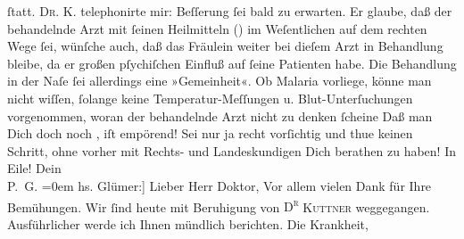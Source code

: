 \begin{ledgroupsized}[t]{13cm}
               ſtatt. \textsc{Dr. K.} telephonirte mir: Beſſerung ſei bald zu erwarten. Er glaube, daß der
               behandelnde Arzt mit ſeinen
               Heilmitteln (\label{K_L03056-3v}\label{K_L03056-3h}) im Weſentlichen auf dem
               rechten Wege ſei, wünſche {\pb}auch, daß das Fräulein weiter bei dieſem
                  Arzt in Behandlung
               bleibe, da er großen pſychiſchen Einfluß auf ſeine Patienten habe. Die Behandlung in
               der Naſe ſei allerdings eine »Gemeinheit«. Ob Malaria vorliege, könne man nicht
               wiſſen, ſolange keine Temperatur-Meſſungen u. Blut-Unterſuchungen vorgenommen, woran
               der behandelnde Arzt nicht
               zu denken ſcheine{\dotsfour}\pend
           \pstart
           Daß man Dich doch noch \label{K_L03056-4v}\label{K_L03056-4h}, iſt {\pb}empörend! Sei nur ja recht vorſichtig
               und thue keinen Schritt, ohne vorher mit Rechts- und Landeskundigen Dich berathen zu
               haben!\pend
           \pstart
           In Eile!\pend
           \pstart
           Dein {\\[\baselineskip]}\spacefill\mbox{P. G.}\pend
           \leftskip=0em{}{\bigskip}\pstart
           \noindent{}{\pb}{[}hs. Glümer:{]} Lieber Herr Doktor,\pend
           \pstart
           Vor allem vielen Dank für Ihre Bemühungen. Wir ſind heute mit Beruhigung
               von \textsc{D\textsuperscript{r}}{ }\textsc{Kuttner} weggegangen. Ausführlicher werde ich Ihnen mündlich berichten. Die Krankheit,

\end{ledgroupsized}
